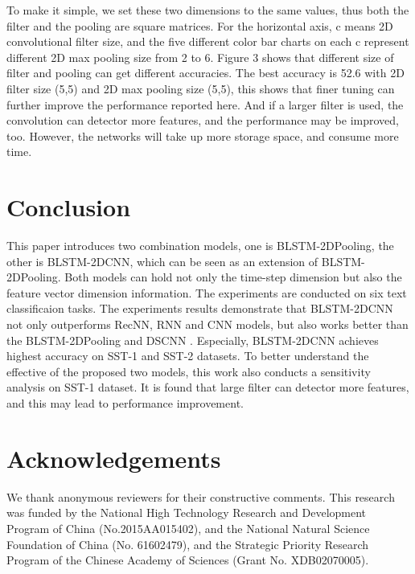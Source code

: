 \documentclass[11pt]{article}
\begin{document}
To make it simple, we set these two dimensions to the same values, thus both the filter and the pooling are square matrices. For the horizontal axis, c means 2D convolutional filter size, and the five different color bar charts on each c represent different 2D max pooling size from 2 to 6. Figure 3 shows that different size of filter and pooling can get different accuracies. 
The best accuracy is 52.6 with 2D filter size (5,5) and 2D max pooling size (5,5), this shows that finer tuning can further improve the performance reported here. And if a larger filter is used, the convolution can detector more features, and the performance may be improved, too. However, the networks will take up more storage space, and consume more time. 



\section{Conclusion}
This paper introduces two combination models, one is BLSTM-2DPooling, the other is BLSTM-2DCNN, which can be seen as an extension of BLSTM-2DPooling. Both models can hold not only the time-step dimension but also the feature vector dimension information. The experiments are conducted on six text classificaion tasks. The experiments results demonstrate that BLSTM-2DCNN not only outperforms RecNN, RNN and CNN models, but also works better than the BLSTM-2DPooling and DSCNN \cite{zhang2016dependency}. Especially, BLSTM-2DCNN achieves highest accuracy on SST-1 and SST-2 datasets. To better understand the effective of the proposed two models, this work also conducts a sensitivity analysis on SST-1 dataset. It is found that large filter can detector more features, and this may lead to performance improvement. 





\section*{Acknowledgements}
We thank anonymous reviewers for their constructive comments. This research was funded by the National High Technology Research and Development Program of China (No.2015AA015402), and the National Natural Science Foundation of China (No. 61602479), and the Strategic Priority Research Program of the Chinese Academy of Sciences (Grant No. XDB02070005).






\end{document}
